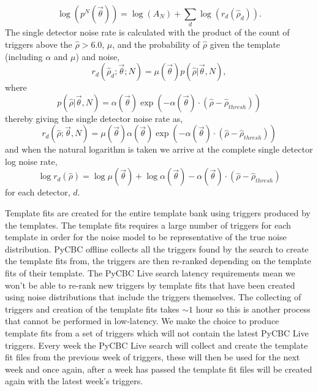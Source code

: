 %
\begin{equation}
    \log(p^{N}(\Vec{\theta})) = \log(A_{N}) +  \sum_{d} \log(r_{d}(\hat{\rho}_{d})) .
\label{5:eqn:comb-log-noise-rate}
\end{equation}
%
The single detector noise rate is calculated with the product of the count of triggers above the $\hat{\rho} > 6.0$, $\mu$, and the probability of $\hat{\rho}$ given the template (including $\alpha$ and $\mu$) and noise,
%
\begin{equation}
    r_{d}(\hat{\rho}_{d}; {\Vec{\theta}}; N) = \mu(\Vec{\theta}) p(\hat{\rho} | \Vec{\theta}, N) ,
\label{5:eqn:single-noise-rate}
\end{equation}
%
where
%
\begin{equation}
    p(\hat{\rho} | \Vec{\theta}, N) = \alpha(\Vec{\theta}) \exp\left(-\alpha(\Vec{\theta})\cdot\left(\hat{\rho} - \hat{\rho}_{thresh}\right)\right)
\label{5:eqn:p-definition}
\end{equation}
%
thereby giving the single detector noise rate as,
%
\begin{equation}
    r_{d}(\hat{\rho}; {\Vec{\theta}}, N) = \mu(\Vec{\theta}) \alpha(\Vec{\theta}) \exp\left(-\alpha(\Vec{\theta}) \cdot (\hat{\rho} - \hat{\rho}_{thresh})\right)
\label{5:eqn:single-noise-rate-full}
\end{equation}
%
and when the natural logarithm is taken we arrive at the complete single detector log noise rate,
%
\begin{equation}
    \log r_{d}(\hat{\rho}) = \log\mu(\Vec{\theta}) +  \log\alpha(\Vec{\theta}) - \alpha(\Vec{\theta}) \cdot(\hat{\rho} - \hat{\rho}_{thresh})
\label{5:eqn:single-log-noise-rate}
\end{equation}
%
for each detector, $d$.

Template fits are created for the entire template bank using triggers produced by the templates. The template fits requires a large number of triggers for each template in order for the noise model to be representative of the true noise distribution. PyCBC offline collects all the triggers found by the search to create the template fits from, the triggers are then re-ranked depending on the template fits of their template. The PyCBC Live search latency requirements mean we won't be able to re-rank new triggers by template fits that have been created using noise distributions that include the triggers themselves. The collecting of triggers and creation of the template fits takes $\sim 1$ hour so this is another process that cannot be performed in low-latency. We make the choice to produce template fits from a set of triggers which will not contain the latest PyCBC Live triggers. Every week the PyCBC Live search will collect and create the template fit files from the previous week of triggers, these will then be used for the next week and once again, after a week has passed the template fit files will be created again with the latest week's triggers. 

